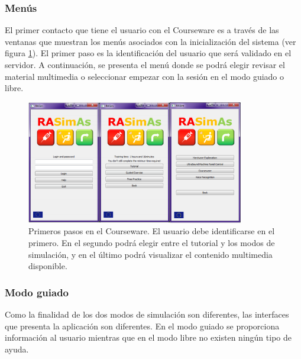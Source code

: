 \subsubsection{Menús} 

El primer contacto que tiene el usuario con el \ac{Courseware} es a través de las ventanas que muestran los menús asociados con la inicialización del sistema (ver figura \ref{fig:courseintro}). El primer paso es la identificación del usuario que será validado en el servidor. A continuación, se presenta el menú donde se podrá elegir revisar el material multimedia o seleccionar empezar con la sesión en el modo guiado o libre. %

\begin{figure}[ht]
    \centering
    \includegraphics[width=0.85\textwidth]{IMG/coursewareintro.PNG}
    \caption{Primeros pasos en el \acs{Courseware}. El usuario debe identificarse en el primero. En el segundo podrá elegir entre el tutorial y los modos de simulación, y en el último podrá visualizar el contenido multimedia disponible.}
    \label{fig:courseintro}
\end{figure}

\subsubsection{Modo guiado}

Como la finalidad de los dos modos de simulación son diferentes, las interfaces que presenta la aplicación son diferentes. En el modo guiado se proporciona información al usuario mientras que en el modo libre no existen ningún tipo de ayuda.

